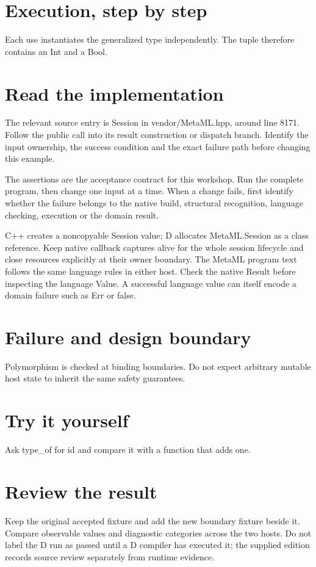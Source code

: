 
\section*{Execution, step by step}
Each use instantiates the generalized type independently. The tuple therefore contains an Int and a Bool.

\section*{Read the implementation}
The relevant source entry is Session in vendor/MetaML.hpp, around line 8171. Follow the public call into its result construction or dispatch branch. Identify the input ownership, the success condition and the exact failure path before changing this example.

The assertions are the acceptance contract for this workshop. Run the complete program, then change one input at a time. When a change fails, first identify whether the failure belongs to the native build, structural recognition, language checking, execution or the domain result.

\clearpage
{}
C++ creates a noncopyable Session value; D allocates MetaML.Session as a class reference. Keep native callback captures alive for the whole session lifecycle and close resources explicitly at their owner boundary. The MetaML program text follows the same language rules in either host. Check the native Result before inspecting the language Value. A successful language value can itself encode a domain failure such as Err or false.


\section*{Failure and design boundary}
Polymorphism is checked at binding boundaries. Do not expect arbitrary mutable host state to inherit the same safety guarantees.

\section*{Try it yourself}
Ask type\_of for id and compare it with a function that adds one.

\section*{Review the result}
Keep the original accepted fixture and add the new boundary fixture beside it. Compare observable values and diagnostic categories across the two hosts. Do not label the D run as passed until a D compiler has executed it; the supplied edition records source review separately from runtime evidence.

